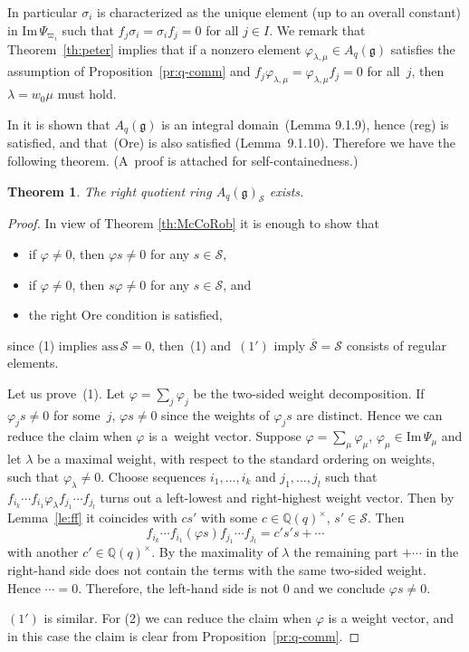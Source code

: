 \documentclass[11pt]{article}
\newtheorem{theorem}{Theorem}
\newcommand{\geh}{\mathfrak{g}}
\newcommand{\la}{\lambda}
\newcommand{\Q}{{\mathbb Q}}
\begin{document}
In particular
$\sigma_i$ is characterized as the unique element (up to an overall constant)
in $\mathrm{Im}\, \Psi_{\varpi_i}$ such that
$f_j \sigma_i = \sigma_i f_j = 0$ for all $j \in I$.
We remark that Theorem~\ref{th:peter} implies that
if a nonzero element $\varphi_{\lambda,\mu} \in A_q(\geh)$
satisf\/ies the assumption of Proposition~\ref{pr:q-comm} and
$f_j \varphi_{\lambda,\mu}
= \varphi_{\lambda,\mu} f_j = 0$ for all~$j$,
then $\lambda = w_0\mu$ must hold.

In \cite{Joseph} it is shown that $A_q(\geh)$ is an integral domain~(Lemma 9.1.9), hence (reg) is
satisf\/ied, and that~(Ore) is also satisf\/ied (Lemma~9.1.10). Therefore we have the following theorem.
(A~proof is attached for self-containedness.)

\begin{theorem}\label{th:quotient}
The right quotient ring $A_q(\geh)_\mathcal{S}$ exists.
\end{theorem}

\begin{proof}
In view of Theorem \ref{th:McCoRob} it is enough to show that
\begin{itemize}\itemsep=0pt
\item[(1)] if $\varphi\ne0$, then $\varphi s\ne0$ for any $s\in\mathcal{S}$,
\item[$(1')$] if $\varphi\ne0$, then $s\varphi\ne0$ for any $s\in\mathcal{S}$, and
\item[(2)] the right Ore condition is satisf\/ied,
\end{itemize}
since (1) implies $\mathrm{ass}\,\mathcal{S}=0$, then~(1) and~$(1')$ imply $\overline{\mathcal{S}}=
\mathcal{S}$ consists of regular elements.

Let us prove~(1). Let $\varphi=\sum_j\varphi_j$ be the two-sided weight decomposition.
If $\varphi_js\ne0$ for some~$j$,
$\varphi s\ne0$ since the weights of $\varphi_js$ are distinct.
Hence we can reduce the claim when $\varphi$ is a~weight vector.
Suppose $\varphi=\sum_\mu\varphi_\mu$, $\varphi_\mu\in\mathrm{Im}\,\Psi_\mu$ and let $\la$ be a maximal
weight, with respect to the standard ordering on weights, such that $\varphi_\la\ne0$. Choose sequences
$i_1,\ldots,i_k$ and $j_1,\ldots,j_l$ such that
$f_{i_k}\cdots f_{i_1}\varphi_\la f_{j_1}\cdots f_{j_l}$
turns out a left-lowest and right-highest weight vector.
Then by Lemma~\ref{le:ff} it coincides with $cs'$
with some $c\in\Q(q)^\times$, $s'\in\mathcal{S}$. Then
\[
f_{i_k}\cdots f_{i_1}(\varphi s)f_{j_1}\cdots f_{j_l}=c's's+\cdots
\]
with another $c'\in\Q(q)^\times$. By the maximality of $\la$ the remaining part $+\cdots$ in the right-hand
side does not contain
the terms with the same two-sided weight. Hence $\cdots=0$.
Therefore, the left-hand side is
not $0$ and we conclude $\varphi s\ne0$.

$(1')$ is similar.
For (2) we can reduce the claim when $\varphi$ is a weight vector, and in this case the claim is clear from
Proposition~\ref{pr:q-comm}.
\end{proof}
\end{document}

